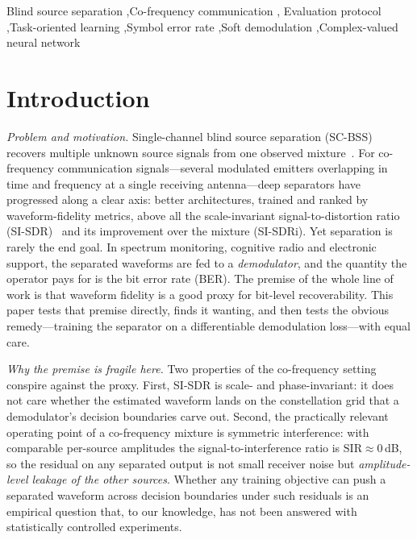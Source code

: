 \documentclass[review,12pt]{elsarticle}
\newcommand{\sir}{\mathrm{SIR}}
\begin{document}
\begin{frontmatter}
\begin{keyword}
Blind source separation \sep Co-frequency communication \sep
Evaluation protocol \sep Task-oriented learning \sep Symbol error rate
\sep Soft demodulation \sep Complex-valued neural network
\end{keyword}

\end{frontmatter}

\linenumbers

\section{Introduction}
\label{sec:intro}

\emph{Problem and motivation.} Single-channel blind source separation
(SC-BSS) recovers multiple unknown source signals from one observed
mixture~\cite{hou2022single,guo2024single}. For co-frequency
communication signals---several modulated emitters overlapping in time
and frequency at a single receiving antenna---deep separators have
progressed along a clear axis: better architectures, trained and ranked
by waveform-fidelity metrics, above all the scale-invariant
signal-to-distortion ratio (SI-SDR)~\cite{kolbaek2017pit,leroux2019sdr}
and its improvement over the mixture (SI-SDRi). Yet separation is rarely
the end goal. In spectrum monitoring, cognitive radio and electronic
support, the separated waveforms are fed to a \emph{demodulator}, and
the quantity the operator pays for is the bit error rate (BER). The
premise of the whole line of work is that waveform fidelity is a good
proxy for bit-level recoverability. This paper tests that premise
directly, finds it wanting, and then tests the obvious remedy---training
the separator on a differentiable demodulation loss---with equal care.

\emph{Why the premise is fragile here.} Two properties of the
co-frequency setting conspire against the proxy. First, SI-SDR is
scale- and phase-invariant: it does not care whether the estimated
waveform lands on the constellation grid that a demodulator's decision
boundaries carve out. Second, the practically relevant operating point
of a co-frequency mixture is symmetric interference: with comparable
per-source amplitudes the signal-to-interference ratio is
$\sir \approx 0$\,dB, so the residual on any separated output is not
small receiver noise but \emph{amplitude-level leakage of the other
sources}. Whether any training objective can push a separated waveform
across decision boundaries under such residuals is an empirical question
that, to our knowledge, has not been answered with statistically
controlled experiments.
\end{document}
